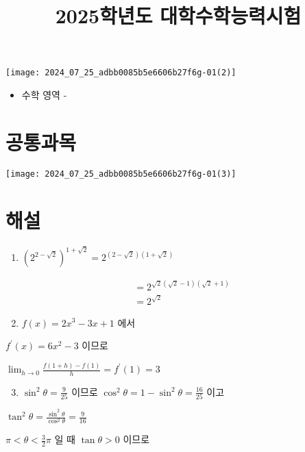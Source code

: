 \documentclass[10pt]{article}
\title{2025학년도 대학수학능력시험 }
\author{}
\date{}
\begin{document}
\maketitle
\begin{center}
\texttt{[image: 2024\_07\_25\_adbb0085b5e6606b27f6g-01(2)]}
\end{center}

\begin{itemize}
  \item 수학 영역 -
\end{itemize}

\section*{공통과목}
\begin{center}
\texttt{[image: 2024\_07\_25\_adbb0085b5e6606b27f6g-01(3)]}
\end{center}

\section*{해설}
\begin{enumerate}
  \item $\left(2^{2-\sqrt{2}}\right)^{1+\sqrt{2}}=2^{(2-\sqrt{2})(1+\sqrt{2})}$
\end{enumerate}

\[
\begin{aligned}
& =2^{\sqrt{2}(\sqrt{2}-1)(\sqrt{2}+1)} \\
& =2^{\sqrt{2}}
\end{aligned}
\]

\begin{enumerate}
  \setcounter{enumi}{1}
  \item $f(x)=2 x^{3}-3 x+1$ 에서
\end{enumerate}

$f^{\prime}(x)=6 x^{2}-3$ 이므로

$\lim _{h \rightarrow 0} \frac{f(1+h)-f(1)}{h}=f^{\prime}(1)=3$

\begin{enumerate}
  \setcounter{enumi}{2}
  \item $\sin ^{2} \theta=\frac{9}{25}$ 이므로 $\cos ^{2} \theta=1-\sin ^{2} \theta=\frac{16}{25}$ 이고
\end{enumerate}

$\tan ^{2} \theta=\frac{\sin ^{2} \theta}{\cos ^{2} \theta}=\frac{9}{16}$

$\pi<\theta<\frac{3}{2} \pi$ 일 때 $\tan \theta>0$ 이므로
\end{document}
